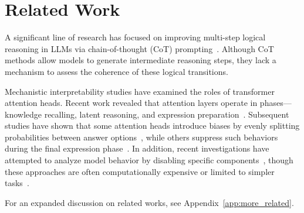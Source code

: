 \section{Related Work}
\label{sec:related}
A significant line of research has focused on improving multi-step logical reasoning in LLMs via chain-of-thought (CoT) prompting~\cite{ChainOfThought, kojima2022large, Yang2024DoLL, Seals2023EvaluatingTD, wan-etal-2024-logicasker}. Although CoT methods allow models to generate intermediate reasoning steps, they lack a  mechanism to assess the  coherence of these logical transitions.



Mechanistic interpretability studies have examined the roles of transformer attention heads. Recent work revealed that attention layers operate in phases—knowledge recalling, latent reasoning, and expression preparation~\cite{elhage2021mathematical, olah2020zoom, attention_heads_survey}. Subsequent studies have shown that some attention heads introduce biases by evenly splitting probabilities between answer options~\cite{lieberum2023does, yu2024correcting}, while others suppress such behaviors during the final expression phase~\cite{kim2024mechanistic}. In addition, recent investigations have attempted to analyze model behavior by disabling specific components~\cite{zhangtowards, todd2024function, NEURIPS2024_d6df31b1}, though these approaches are often computationally expensive or limited to simpler tasks~\cite{wang2023interpretability, NEURIPS2024_d6df31b1}.


For an expanded discussion on related works, see Appendix~\ref{app:more_related}.